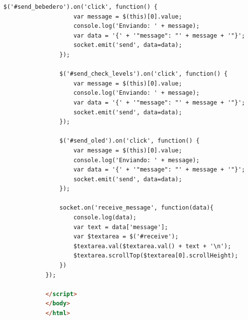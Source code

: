 \documentclass[12pt]{article}
\begin{document}
\begin{lstlisting}[language=html]
				$('#send_bebedero').on('click', function() {
					var message = $(this)[0].value;
					console.log('Enviando: ' + message);
					var data = '{' + '"message": "' + message + '"}';
					socket.emit('send', data=data);
				});
				
				$('#send_check_levels').on('click', function() {
					var message = $(this)[0].value;
					console.log('Enviando: ' + message);
					var data = '{' + '"message": "' + message + '"}';
					socket.emit('send', data=data);
				});
				
				$('#send_oled').on('click', function() {
					var message = $(this)[0].value;
					console.log('Enviando: ' + message);
					var data = '{' + '"message": "' + message + '"}';
					socket.emit('send', data=data);
				});
				
				socket.on('receive_message', function(data){
					console.log(data);
					var text = data['message'];
					var $textarea = $('#receive');
					$textarea.val($textarea.val() + text + '\n');
					$textarea.scrollTop($textarea[0].scrollHeight);
				})
			});
			
			</script>
			</body>
			</html>
	\end{lstlisting}
\end{document}
